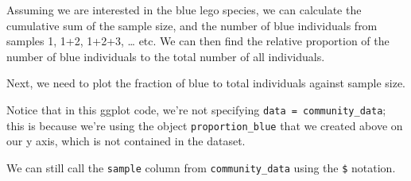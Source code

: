 \documentclass[
  letterpaper,
  DIV=11,
  numbers=noendperiod]{scrreprt}
\newenvironment{Shaded}{\begin{snugshade}}{\end{snugshade}}
\newcommand{\AttributeTok}[1]{\textcolor[rgb]{0.40,0.45,0.13}{#1}}
\newcommand{\DecValTok}[1]{\textcolor[rgb]{0.68,0.00,0.00}{#1}}
\newcommand{\FloatTok}[1]{\textcolor[rgb]{0.68,0.00,0.00}{#1}}
\newcommand{\FunctionTok}[1]{\textcolor[rgb]{0.28,0.35,0.67}{#1}}
\newcommand{\NormalTok}[1]{\textcolor[rgb]{0.00,0.23,0.31}{#1}}
\newcommand{\OtherTok}[1]{\textcolor[rgb]{0.00,0.23,0.31}{#1}}
\newcommand{\SpecialCharTok}[1]{\textcolor[rgb]{0.37,0.37,0.37}{#1}}
\newcommand{\StringTok}[1]{\textcolor[rgb]{0.13,0.47,0.30}{#1}}
\begin{document}
Assuming we are interested in the blue lego species, we can calculate
the cumulative sum of the sample size, and the number of blue
individuals from samples 1, 1+2, 1+2+3, \ldots{} etc. We can then find
the relative proportion of the number of blue individuals to the total
number of all individuals.

\begin{Shaded}
\end{Shaded}

Next, we need to plot the fraction of blue to total individuals against
sample size.

Notice that in this ggplot code, we're not specifying
\texttt{data\ =\ community\_data}; this is because we're using the
object \texttt{proportion\_blue} that we created above on our y axis,
which is not contained in the dataset.

We can still call the \texttt{sample} column from
\texttt{community\_data} using the \texttt{\$} notation.

\begin{Shaded}
\end{Shaded}
\end{document}
